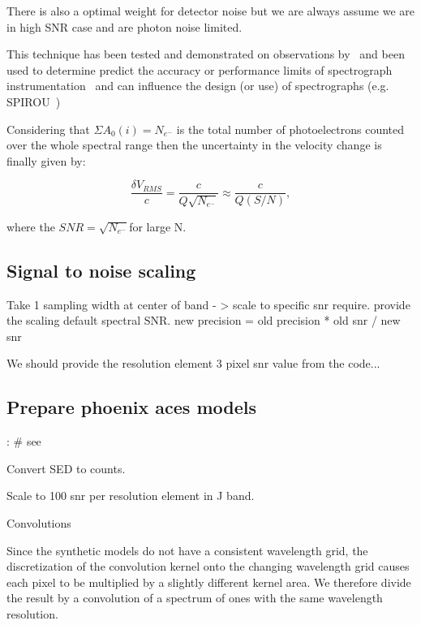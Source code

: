 There is also a optimal weight for detector noise but we are always assume we are in high SNR case and are photon noise limited.

 
This technique has been tested and demonstrated on observations by~\citet{connes_demonstration_1996} and been used to determine predict the accuracy or performance limits of spectrograph instrumentation~\citet{Connes1985,bouchy_fundamental_2001} and can influence the design (or use) of spectrographs   
 (e.g. SPIROU~\citep{artigau_spirou_2014,figueira_radial_2016})


Considering that \(\Sigma{A_0(i)} = N_{e^-} \) is the total number of photoelectrons counted over the whole spectral range then the uncertainty in the velocity change is finally given by:

\begin{equation}
\frac{\delta V_{RMS}}{c} = \frac{c}{Q \sqrt{N_{e^-}}} \approx \frac{c}{Q (S/N)},
\end{equation}

where the \(SNR=\sqrt{N_{e^-}} \)for large N.  




\subsection {Signal to noise scaling}
Take 1 sampling width at center of band - > scale to specific snr require.
provide the scaling default spectral SNR.
new precision = old precision * old snr / new snr

We should provide the resolution element 3 pixel snr value from the code...


\subsection{Prepare phoenix aces models}:
\# see~\citet{figueira_radial_2016} 

Convert SED to counts.


Scale to 100 snr per resolution element in J band.

Convolutions


Since the synthetic models do not have a consistent wavelength grid, the discretization of the convolution kernel onto the  changing wavelength grid causes each pixel to be multiplied by  a slightly different kernel area. We therefore divide the result by a convolution of a spectrum of ones with the same wavelength resolution.

